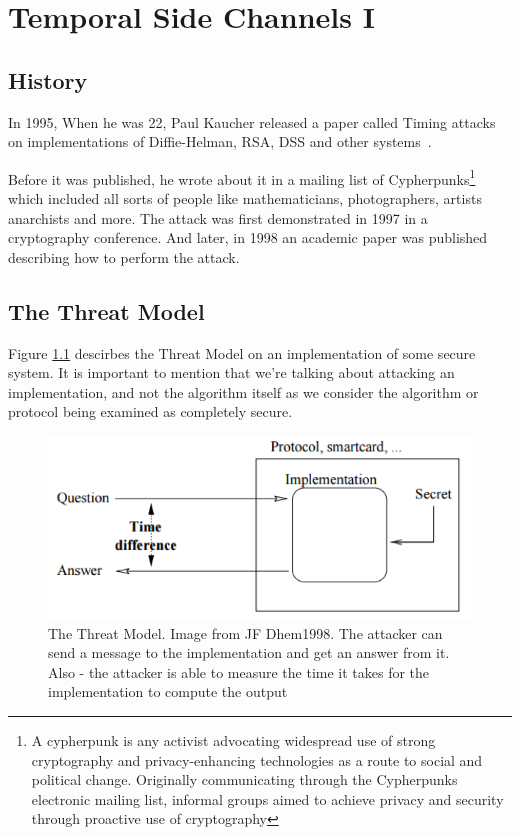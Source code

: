 \chapter{Temporal Side Channels I} 

\section{History}
In 1995, When he was 22, Paul Kaucher released a paper called Timing attacks on implementations of Diffie-Helman, RSA, DSS and other systems~\cite{kocher1996timing}.

Before it was published, he wrote about it in a mailing list of Cypherpunks\footnote{A cypherpunk is any activist advocating widespread use of strong cryptography and privacy-enhancing technologies as a route to social and political change. Originally communicating through the Cypherpunks electronic mailing list, informal groups aimed to achieve privacy and security through proactive use of cryptography}
which included all sorts of people like mathematicians, photographers, artists anarchists and more.
The attack was first demonstrated in 1997 in a cryptography conference.
And later, in 1998 an academic paper was published describing how to perform the attack.



\section{The Threat Model}
Figure \ref{c1_fig_threat_model} descirbes the Threat Model on an implementation of some secure system.
It is important to mention that we're talking about attacking an implementation, and not the algorithm itself as we consider the algorithm or protocol being examined as completely secure.

\begin{figure}[H]
    \centering
    \includegraphics{images/chapter_1/threat_model.png}
    \caption{The Threat Model. Image from JF Dhem1998.
     The attacker can send a message to the implementation and get an answer from it. Also - the attacker is able to measure the time it takes for the implementation to compute the output}
    \label{c1_fig_threat_model}
\end{figure}

